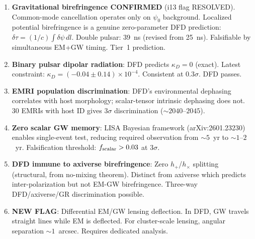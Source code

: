 \documentclass[11pt]{article}
\newcommand{\ee}[1]{\times 10^{#1}}
\begin{document}
\begin{enumerate}
\item \textbf{Gravitational birefringence CONFIRMED} (i13 flag
  RESOLVED). Common-mode cancellation operates only on $\psi_0$
  background. Localized potential birefringence is a genuine
  zero-parameter DFD prediction: $\delta\tau = (1/c)\int\delta\psi\,dl$.
  Double pulsar: 39~ns (revised from 25~ns). Falsifiable by
  simultaneous EM+GW timing. Tier~1 prediction.

\item \textbf{Binary pulsar dipolar radiation}: DFD predicts
  $\kappa_D = 0$ (exact). Latest constraint: $\kappa_D = (-0.04 \pm
  0.14)\ee{-4}$. Consistent at $0.3\sigma$. DFD passes.

\item \textbf{EMRI population discrimination}: DFD's environmental
  dephasing correlates with host morphology; scalar-tensor intrinsic
  dephasing does not. 30 EMRIs with host ID gives $3\sigma$
  discrimination ($\sim 2040$--$2045$).

\item \textbf{Zero scalar GW memory}: LISA Bayesian framework
  (arXiv:2601.23230) enables single-event test, reducing required
  observation from $\sim 5$~yr to $\sim 1$--$2$~yr. Falsification
  threshold: $f_{\rm scalar} > 0.03$ at $3\sigma$.

\item \textbf{DFD immune to axiverse birefringence}: Zero
  $h_+$/$h_\times$ splitting (structural, from no-mixing theorem).
  Distinct from axiverse which predicts inter-polarization but not
  EM-GW birefringence. Three-way DFD/axiverse/GR discrimination
  possible.

\item \textbf{NEW FLAG}: Differential EM/GW lensing deflection.
  In DFD, GW travels straight lines while EM is deflected. For
  cluster-scale lensing, angular separation $\sim 1$~arcsec.
  Requires dedicated analysis.
\end{enumerate}
\end{document}
